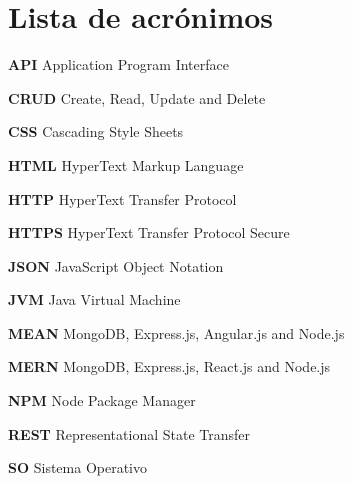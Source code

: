 \section*{Lista de acrónimos}

\noindent \textbf{API} Application Program Interface \newline \smallskip 

\noindent \textbf{CRUD} Create, Read, Update and Delete \newline \smallskip

\noindent \textbf{CSS} Cascading Style Sheets \newline \smallskip

\noindent \textbf{HTML} HyperText Markup Language \newline \smallskip

\noindent \textbf{HTTP} HyperText Transfer Protocol \newline \smallskip

\noindent \textbf{HTTPS} HyperText Transfer Protocol Secure \newline \smallskip

\noindent \textbf{JSON} JavaScript Object Notation \newline \smallskip

\noindent \textbf{JVM} Java Virtual Machine \newline \smallskip

\noindent \textbf{MEAN} MongoDB, Express.js, Angular.js and Node.js \newline \smallskip 

\noindent \textbf{MERN} MongoDB, Express.js, React.js and Node.js \newline \smallskip

\noindent \textbf{NPM} Node Package Manager \newline \smallskip

\noindent \textbf{REST} Representational State Transfer \newline \smallskip

\noindent \textbf{SO} Sistema Operativo \newline \smallskip